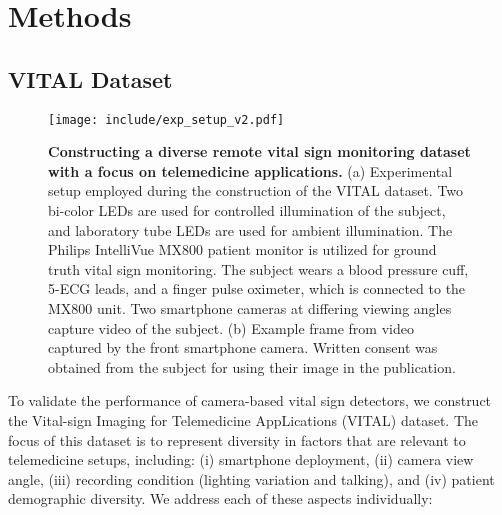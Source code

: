 %
%

\chapter{Methods} \label{chap:methods}

\section{VITAL Dataset}

\begin{figure}
    \centering
    \texttt{[image: include/exp\_setup\_v2.pdf]}
    \caption{\textbf{Constructing a diverse remote vital sign monitoring dataset with a focus on telemedicine applications.} (a) Experimental setup employed during the construction of the VITAL dataset. Two bi-color LEDs are used for controlled illumination of the subject, and laboratory tube LEDs are used for ambient illumination. The Philips IntelliVue MX800 patient monitor is utilized for ground truth vital sign monitoring. The subject wears a blood pressure cuff, 5-ECG leads, and a finger pulse oximeter, which is connected to the MX800 unit. Two smartphone cameras at differing viewing angles capture video of the subject. (b) Example frame from video captured by the front smartphone camera. Written consent was obtained from the subject for using their image in the publication.}
    \label{fig:exp_setup}
\end{figure}

To validate the performance of camera-based vital sign detectors, we construct the Vital-sign Imaging for Telemedicine AppLications (VITAL) dataset. The focus of this dataset is to represent diversity in factors that are relevant to telemedicine setups, including: (i) smartphone deployment, (ii) camera view angle, (iii) recording condition (lighting variation and talking), and (iv) patient demographic diversity. We address each of these aspects individually:

